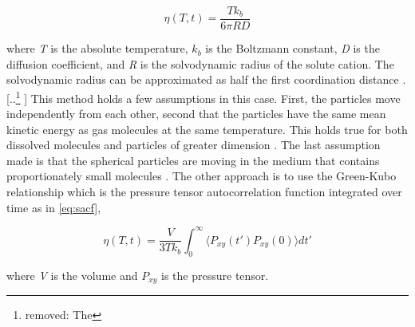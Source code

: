 \documentclass[review]{elsarticle}
\providecommand{\DIFaddtex}[1]{{\protect\color{blue} \sf #1}} %
\providecommand{\DIFdeltex}[1]{{\protect\color{red} [..\footnote{removed: #1} ]}} %
\providecommand{\DIFaddbegin}{} %
\providecommand{\DIFaddend}{} %
\providecommand{\DIFdelbegin}{} %
\providecommand{\DIFdelend}{} %
\providecommand{\DIFadd}[1]{\texorpdfstring{\DIFaddtex{#1}}{#1}} %
\providecommand{\DIFdel}[1]{\texorpdfstring{\DIFdeltex{#1}}{}} %
\newcommand{\DIFscaledelfig}{0.5}
\newlength{\DIFdelgraphicswidth} %
\newlength{\DIFdelgraphicsheight} %
\newcommand{\DIFaddincludegraphics}[2][]{{\color{blue}\fbox{\DIFOincludegraphics[#1]{#2}}}} %
\newcommand{\DIFdelincludegraphics}[2][]{%
\sbox{\DIFdelgraphicsbox}{\DIFOincludegraphics[#1]{#2}}%
\settoboxwidth{\DIFdelgraphicswidth}{\DIFdelgraphicsbox} %
\settoboxtotalheight{\DIFdelgraphicsheight}{\DIFdelgraphicsbox} %
\scalebox{\DIFscaledelfig}{%
\parbox[b]{\DIFdelgraphicswidth}{\usebox{\DIFdelgraphicsbox}\\[-\baselineskip] \rule{\DIFdelgraphicswidth}{0em}}\llap{\resizebox{\DIFdelgraphicswidth}{\DIFdelgraphicsheight}{%
\setlength{\unitlength}{\DIFdelgraphicswidth}%
\begin{picture}(1,1)%
\thicklines\linethickness{2pt} %
{\color[rgb]{1,0,0}\put(0,0){\framebox(1,1){}}}%
{\color[rgb]{1,0,0}\put(0,0){\line( 1,1){1}}}%
{\color[rgb]{1,0,0}\put(0,1){\line(1,-1){1}}}%
\end{picture}%
}\hspace*{3pt}}} %
} %
\DeclareRobustCommand{\DIFaddbegin}{\DIFOaddbegin \let\includegraphics\DIFaddincludegraphics} %
\DeclareRobustCommand{\DIFaddend}{\DIFOaddend \let\includegraphics\DIFOincludegraphics} %
\DeclareRobustCommand{\DIFdelbegin}{\DIFOdelbegin \let\includegraphics\DIFdelincludegraphics} %
\DeclareRobustCommand{\DIFdelend}{\DIFOaddend \let\includegraphics\DIFOincludegraphics} %
\begin{document}
\begin{equation}
  \label{eq:SES}
     \eta(T,t) = \frac{Tk_b}{6\pi RD}
\end{equation}

\noindent where \textit{T} is the absolute temperature, \textit{$k_b$} is the Boltzmann constant, \textit{D} is the diffusion coefficient, and \textit{R} is the solvodynamic radius of the solute cation. The solvodynamic radius can be approximated as half the first coordination distance \cite{SONG2017462}. \DIFdelbegin \DIFdel{The }\DIFdelend \DIFaddbegin \DIFadd{This method holds a few assumptions in this case. First, the particles move independently from each other, second that the particles have the same mean kinetic energy as gas molecules at the same temperature. This holds true for both dissolved molecules and particles of greater dimension \cite{Miller1924}. The last assumption made is that the spherical particles are moving in the medium that contains proportionately small molecules \cite{Miller1924}. The }\DIFaddend other approach is to use the Green-Kubo relationship which is the pressure tensor autocorrelation function integrated over time \cite{rapaport2004art} as in \cref{eq:sacf},

\begin{equation}
  \label{eq:sacf}
     \eta(T,t) = \frac{V}{3Tk_b}\int_0^\infty \langle P_{xy}(t')P_{xy}(0)\rangle dt'
\end{equation}

\noindent where \textit{V} is the volume and \textit{$P_{xy}$} is the pressure tensor.
\end{document}

